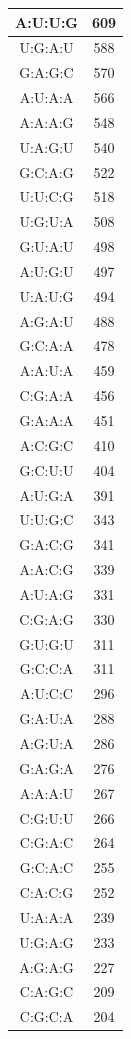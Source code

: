\begin{center}
\begin{longtable}{c|c}
A:U:U:G & 609 \\ \hline
U:G:A:U & 588 \\ \hline
G:A:G:C & 570 \\ \hline
A:U:A:A & 566 \\ \hline
A:A:A:G & 548 \\ \hline
U:A:G:U & 540 \\ \hline
G:C:A:G & 522 \\ \hline
U:U:C:G & 518 \\ \hline
U:G:U:A & 508 \\ \hline
G:U:A:U & 498 \\ \hline
A:U:G:U & 497 \\ \hline
U:A:U:G & 494 \\ \hline
A:G:A:U & 488 \\ \hline
G:C:A:A & 478 \\ \hline
A:A:U:A & 459 \\ \hline
C:G:A:A & 456 \\ \hline
G:A:A:A & 451 \\ \hline
A:C:G:C & 410 \\ \hline
G:C:U:U & 404 \\ \hline
A:U:G:A & 391 \\ \hline
U:U:G:C & 343 \\ \hline
G:A:C:G & 341 \\ \hline
A:A:C:G & 339 \\ \hline
A:U:A:G & 331 \\ \hline
C:G:A:G & 330 \\ \hline
G:U:G:U & 311 \\ \hline
G:C:C:A & 311 \\ \hline
A:U:C:C & 296 \\ \hline
G:A:U:A & 288 \\ \hline
A:G:U:A & 286 \\ \hline
G:A:G:A & 276 \\ \hline
A:A:A:U & 267 \\ \hline
C:G:U:U & 266 \\ \hline
C:G:A:C & 264 \\ \hline
G:C:A:C & 255 \\ \hline
C:A:C:G & 252 \\ \hline
U:A:A:A & 239 \\ \hline
U:G:A:G & 233 \\ \hline
A:G:A:G & 227 \\ \hline
C:A:G:C & 209 \\ \hline
C:G:C:A & 204 \\ \hline

\end{longtable}
\end{center}
